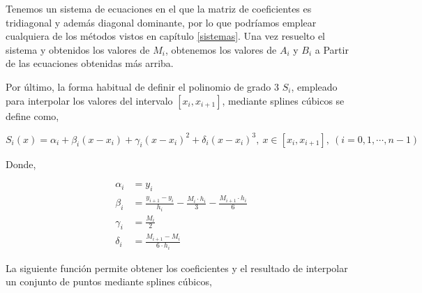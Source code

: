Tenemos un sistema de ecuaciones en el que la matriz de coeficientes es tridiagonal y además diagonal dominante, por lo que podríamos emplear cualquiera de los métodos vistos en capítulo  
\ref{sistemas}.  Una vez resuelto el sistema y obtenidos los valores de $M_i$, obtenemos los valores de $A_i$ y $B_i$ a Partir de las ecuaciones obtenidas más arriba.

Por último, la forma habitual de definir el polinomio de grado 3 $S_i$, empleado para interpolar los valores del intervalo $[x_i,x_{i+1}]$, mediante splines cúbicos se define como, 

\begin{equation*}
S_i(x)=\alpha_i+\beta_i(x-x_i)+\gamma_i(x-x_i)^2+\delta_i(x-x_i)^3, \ x\in [x_i,x_{i+1}],\ (i=0,1,\cdots,n-1)
\end{equation*}

Donde,

\begin{align*}
\alpha_i &=y_i\\
\beta_i &=\frac{y_{i+1}-y_i}{h_i}-\frac{M_i \cdot h_i}{3}-\frac{M_{i+1} \cdot h_i}{6}\\
\gamma_i &=\frac{M_i}{2}\\
\delta_i &=\frac{M_{i+1}-M_i}{6\cdot h_i}
\end{align*}

La siguiente función permite obtener los coeficientes y el resultado de interpolar un conjunto de puntos mediante splines cúbicos,




